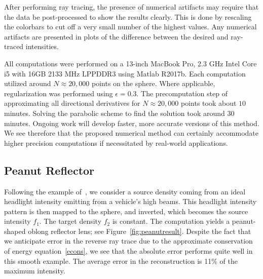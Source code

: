 \documentclass{amsart}
\theoremstyle{lemma}
\theoremstyle{remark}
\begin{document}
After performing ray tracing, the presence of numerical artifacts may require that the data be post-processed to show the results clearly. This is done by rescaling the colorbars to cut off a very small number of the highest values. Any numerical artifacts are presented in plots of the difference between the desired and ray-traced intensities.

All computations were performed on a 13-inch MacBook Pro, 2.3 GHz Intel Core i5 with 16GB 2133 MHz LPPDDR3 using Matlab R2017b. Each computation utilized around $N\approx 20,000$ points on the sphere.  Where applicable, regularization was performed using $\epsilon=0.3$. The precomputation step of approximating all directional derivatives for $N\approx20,000$ points took about $10$ minutes. Solving the parabolic scheme to find the solution took around $30$ minutes. Ongoing work will develop faster, more accurate versions of this method.  We see therefore that the proposed numerical method can certainly accommodate higher precision computations if necessitated by real-world applications.

\subsection{Peanut Reflector}

Following the example of~\cite{RomijnSphere}, we consider a source density coming from an ideal headlight intensity emitting from a vehicle's high beams. This headlight intensity pattern is then mapped to the sphere, and inverted, which becomes the source intensity $f_1$. The target density $f_2$ is constant. 
The computation yields a peanut-shaped oblong reflector lens; see Figure~\ref{fig:peanutresult}. Despite the fact that we anticipate error in the reverse ray trace due to the approximate conservation of energy equation~\eqref{econs}, we see that the absolute error performs quite well in this smooth example.  The average error in the reconstruction is 11\% of the maximum intensity.

\end{document}
